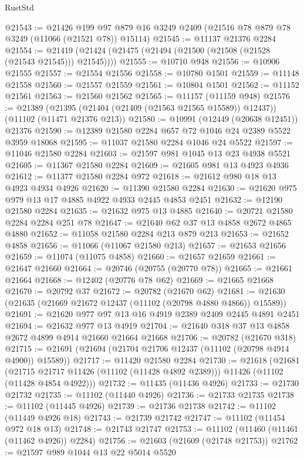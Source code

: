 \begin{lexlean}{RustStd}
\begin{coremodule}
@21543 := @21426
    @199
    @97
    @879
    @16
    @3249
    @2409
    (@21516 @78 @879 @78 @3249 (@11066 (@21521 @78)) @15114)
@21545 := @11137 @21376 @2284
@21554 := @21419 (@21424 (@21475 (@21494 (@21500 (@21508 (@21528 (@21543 @21545))) @21545))))
@21555 := @10710 @948
@21556 := @10906 @21555
@21557 := @21554 @21556
@21558 := @10780 @1501
@21559 := @11148 @21558
@21560 := @21557 @21559
@21561 := @10804 @1501
@21562 := @11152 @21561
@21563 := @21560 @21562
@21565 := @11157 (@11159 @948)
@21576 := @21389
    (@21395 (@21404 (@21409 (@21563 @21565 @15589)) @12437))
    (@11102 (@11471 @21376 @213))
@21580 := @10991 (@12449 (@20638 @12451)) @21376
@21590 := @12389 @21580 @2284 @657 @72 @1046 @24 @2389 @5522 @3959 @18068
@21595 := @11037 @21580 @2284 @1046 @24 @5522
@21597 := @11046 @21580 @2284
@21603 := @21597 @981 @1045 @13 @23 @4938 @5521
@21605 := @11367 @21580 @2284
@21609 := @21605 @981 @13 @4923 @4936
@21612 := @11377 @21580 @2284 @972
@21618 := @21612 @980 @18 @13 @4923 @4934 @4926
@21620 := @11390 @21580 @2284
@21630 := @21620 @975 @979 @13 @17 @4885 @4922 @4933 @2445 @4853 @2451
@21632 := @12190 @21580 @2284
@21635 := @21632 @975 @13 @4885
@21640 := @20721 @21580 @2284 @2284 @251 @78
@21647 := @21640 @62 @37 @13 @4858 @2672 @4865 @4880
@21652 := @11058 @21580 @2284 @213 @879 @213
@21653 := @21652 @4858
@21656 := @11066 (@11067 @21580 @213)
@21657 := @21653 @21656
@21659 := @11074 (@11075 @4858)
@21660 := @21657 @21659
@21661 := @21647 @21660
@21664 := @20746 (@20755 (@20770 @78))
@21665 := @21661 @21664
@21668 := @12402 (@20776 @78 @62)
@21669 := @21665 @21668
@21670 := @20792 @37
@21672 := @20782 (@21670 @62)
@21681 := @21630 (@21635 (@21669 @21672 @12437 (@11102 (@20798 @4880 @4866)) @15589))
@21691 := @21620 @977 @97 @13 @16 @4919 @2389 @2409 @2445 @4891 @2451
@21694 := @21632 @977 @13 @4919
@21704 := @21640 @318 @37 @13 @4858 @2672 @4899 @4914 @21660 @21664 @21668
@21706 := @20782 (@21670 @318)
@21715 := @21691 (@21694 (@21704 @21706 @12437 (@11102 (@20798 @4914 @4900)) @15589))
@21717 := @11420 @21580 @2284
@21730 := @21618
    (@21681
      (@21715 @21717 @11426 (@11102 (@11428 @4892 @2389)))
      @11426
      (@11102 (@11428 @4854 @4922)))
@21732 := @11435 (@11436 @4926)
@21733 := @21730 @21732
@21735 := @11102 (@11440 @4926)
@21736 := @21733 @21735
@21738 := @11102 (@11445 @4926)
@21739 := @21736 @21738
@21742 := @11102 (@11449 @4926 @18)
@21743 := @21739 @21742
@21747 := @11102 (@11454 @972 @18 @13)
@21748 := @21743 @21747
@21753 := @11102 (@11460 (@11461 (@11462 @4926)) @2284)
@21756 := @21603 (@21609 (@21748 @21753))
@21762 := @21597 @989 @1044 @13 @22 @5014 @5520

\end{coremodule}
\end{lexlean}
